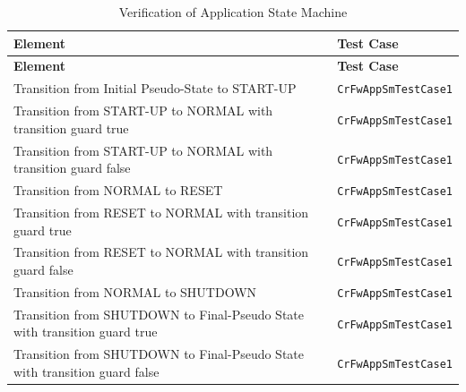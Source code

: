 \documentclass[a4paper,10pt]{article}
\begin{document}
\begin{longtable}{|>{\raggedright}p{6.0cm}|P{5.0cm}|}
\caption{Verification of Application State Machine}
\label{tab:verAppSM}\\
\hline
{}
\textbf{Element} & \textbf{Test Case} \\
\hline
\endfirsthead
{}
\textbf{Element} & \textbf{Test Case} \\
\hline
\endhead
Transition from Initial Pseudo-State to START-UP  & \texttt{CrFwAppSmTestCase1}\\
\hline
Transition from START-UP to NORMAL with transition guard true  & \texttt{CrFwAppSmTestCase1}\\
\hline
Transition from START-UP to NORMAL with transition guard false  & \texttt{CrFwAppSmTestCase1}\\
\hline
Transition from NORMAL to RESET & \texttt{CrFwAppSmTestCase1}\\
\hline
Transition from RESET to NORMAL with transition guard true  & \texttt{CrFwAppSmTestCase1}\\
\hline
Transition from RESET to NORMAL with transition guard false  & \texttt{CrFwAppSmTestCase1}\\
\hline
Transition from NORMAL to SHUTDOWN & \texttt{CrFwAppSmTestCase1}\\
\hline
Transition from SHUTDOWN to Final-Pseudo State with transition guard true  & \texttt{CrFwAppSmTestCase1}\\
\hline
Transition from SHUTDOWN to Final-Pseudo State with transition guard false  & \texttt{CrFwAppSmTestCase1}\\
\end{longtable}
\end{document}
